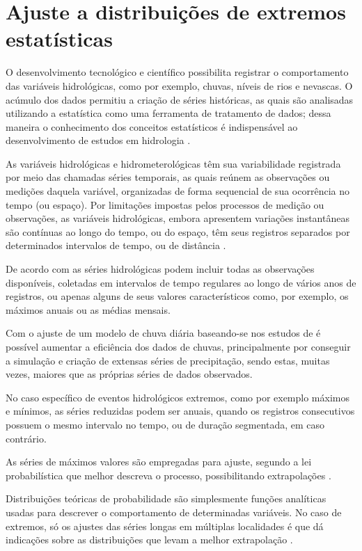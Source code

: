 \section{Ajuste a distribuições de extremos estatísticas}

O desenvolvimento tecnológico e científico possibilita registrar o comportamento das variáveis hidrológicas, como por exemplo, chuvas, níveis de rios e nevascas. O acúmulo dos dados permitiu a criação de séries históricas, as quais são analisadas utilizando a estatística como uma ferramenta de tratamento de dados; dessa maneira o conhecimento dos conceitos estatísticos é indispensável ao desenvolvimento de estudos em hidrologia \cite{hidrologia-estatistica}.

As variáveis hidrológicas e hidrometerológicas têm sua variabilidade registrada por meio das chamadas séries temporais, as quais reúnem as observações ou medições daquela variável, organizadas de forma sequencial de sua ocorrência no tempo (ou espaço). Por limitações impostas pelos processos de medição ou observações, as variáveis hidrológicas, embora apresentem variações instantâneas são contínuas ao longo do tempo, ou do espaço, têm seus registros separados por determinados intervalos de tempo, ou de distância \cite{hidrologia-estatistica-np}.

De acordo com  as séries hidrológicas podem incluir todas as observações disponíveis, coletadas em intervalos de tempo regulares ao longo de vários anos de registros, ou apenas alguns de seus valores característicos como, por exemplo, os máximos anuais ou as médias mensais. 

Com o ajuste de um modelo de chuva diária baseando-se nos estudos de  é possível aumentar a eficiência dos dados de chuvas, principalmente por conseguir a simulação e criação de extensas séries de precipitação, sendo estas, muitas vezes, maiores que as próprias séries de dados observados.

No caso específico de eventos hidrológicos extremos, como por exemplo máximos e mínimos, as séries reduzidas podem ser anuais, quando os registros consecutivos possuem o mesmo intervalo no tempo, ou de duração segmentada, em caso contrário.

As séries de máximos valores são empregadas para ajuste, segundo a lei probabilística que melhor descreva o processo, possibilitando extrapolações \cite{spchuva}.

Distribuições teóricas de probabilidade são simplesmente funções analíticas usadas para descrever o comportamento de determinadas variáveis. No caso de extremos, só os ajustes das séries longas em múltiplas localidades é que dá indicações sobre as distribuições que levam a melhor extrapolação \cite{piracicaba}.

